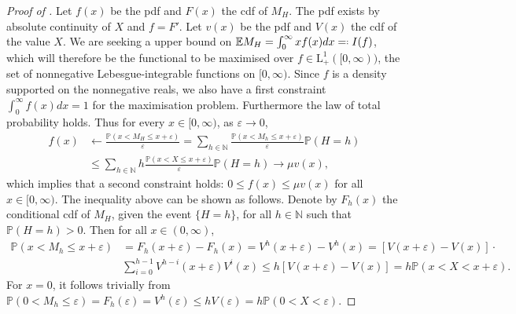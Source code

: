 \documentclass[11pt, a4paper, twoside]{article}
\newcommand*{\eqdef}{=\mathrel{\vcenter{\baselineskip0.5ex\lineskiplimit0pt
			\hbox{\scriptsize.}\hbox{\scriptsize.} }}}
\newcommand{\eps}{\varepsilon}
\newcommand{\NN}{\mathbb{N}}
\newcommand{\EE}{\mathbb{E}}
\newcommand{\PP}{\mathbb{P}}
\numberwithin{equation}{section}
\begin{document}
    \begin{proof}[Proof of ]
		Let $f(x)$ be the pdf and $F(x)$ the cdf of $M_H$. The pdf exists by absolute continuity of $X$ and $f=F'$. Let $v(x)$ be the pdf and $V(x)$ the cdf of the value $X$. We are seeking a upper bound on $\EE M_H=\int_0^\infty x f(x)dx\eqdef I(f)$, which will therefore be the functional to be maximised over $f\in\text{L}_+^1([0,\infty))$, the set of nonnegative Lebesgue-integrable functions on $[0,\infty)$. Since $f$ is a density supported on the nonnegative reals, we also have a first constraint $\int_0^\infty f(x)dx=1$ for the maximisation problem. Furthermore the law of total probability holds. Thus for every $x\in[0,\infty)$, as $\eps\longrightarrow 0$,
		\begin{align*}
			f(x)&\longleftarrow\frac{\PP(x< M_H\le x+\eps)}{\eps}=\sum_{h\in\NN}\frac{\PP(x< M_h\le x+\eps)}{\eps}\PP(H=h)\\&\le\sum_{h\in\NN}h\frac{\PP(x< X\le x+\eps)}{\eps}\PP(H=h)\longrightarrow\mu v(x),
		\end{align*}
		which implies that a second constraint holds: $0\le f(x)\le\mu v(x)$ for all $x\in[0,\infty)$. The inequality above can be shown as follows. Denote by $F_h(x)$ the conditional cdf of $M_H$, given the event $\{H=h\}$, for all $h\in\NN$ such that $\PP(H=h)>0$. Then for all $x\in(0,\infty)$,
		\begin{align*}
			\PP(x< M_h\le x+\eps)&=F_h(x+\eps)-F_h(x)=V^h(x+\eps)-V^h(x)=[V(x+\eps)-V(x)]\cdot\\&\sum_{i=0}^{h-1}V^{h-i}(x+\eps)V^i(x)\le h[V(x+\eps)-V(x)]=h\PP(x<X<x+\eps).
		\end{align*}
		For $x=0$, it follows trivially from $\PP(0<M_h\le \eps)=F_h(\eps)=V^h(\eps)\le hV(\eps)=h\PP(0<X<\eps)$.
		

\end{proof}
\end{document}
